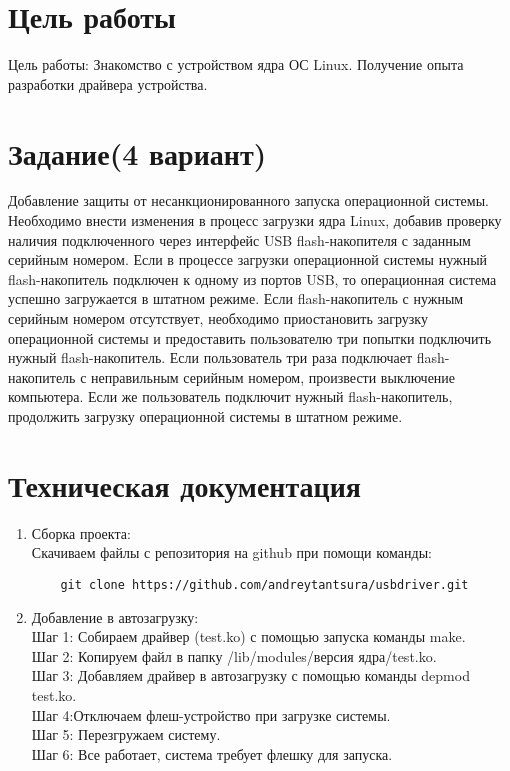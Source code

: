 \documentclass[a4paper]{article}
\begin{document}
\newpage

\section{Цель работы}

\normalsize Цель работы: Знакомство с устройством ядра ОС Linux. Получение опыта разработки драйвера устройства.

\section{Задание(4 вариант)}

Добавление защиты от несанкционированного запуска операционной системы.
Необходимо внести изменения в процесс загрузки ядра Linux, добавив проверку наличия
подключенного через интерфейс USB flash-накопителя с заданным серийным номером.
Если в процессе загрузки операционной системы нужный flash-накопитель подключен к
одному из портов USB, то операционная система успешно загружается в штатном режиме.
Если flash-накопитель с нужным серийным номером отсутствует, необходимо
приостановить загрузку операционной системы и предоставить пользователю три попытки
подключить нужный flash-накопитель. Если пользователь три раза подключает flash-
накопитель с неправильным серийным номером, произвести выключение компьютера.
Если же пользователь подключит нужный flash-накопитель, продолжить загрузку
операционной системы в штатном режиме.

\section{Техническая документация}
\begin{enumerate}
	\item Сборка проекта: \\
		Скачиваем файлы с репозитория на github при помощи команды: \begin{verbatim}
	git clone https://github.com/andreytantsura/usbdriver.git
\end{verbatim} 
	\item Добавление в автозагрузку: \\
	Шаг 1: Собираем драйвер (test.ko) с помощью запуска команды make.
	 \\
	Шаг 2: Копируем файл в папку /lib/modules/версия ядра/test.ko.
	  \\
	Шаг 3: Добавляем драйвер в автозагрузку с помощью команды depmod test.ko.
	  \\
	Шаг 4:Отключаем флеш-устройство при загрузке системы.
	 \\
	Шаг 5: Перезгружаем систему.
	  \\
	Шаг 6:	Все работает, система требует флешку для запуска.
\end{enumerate}
\newpage
\end{document}
